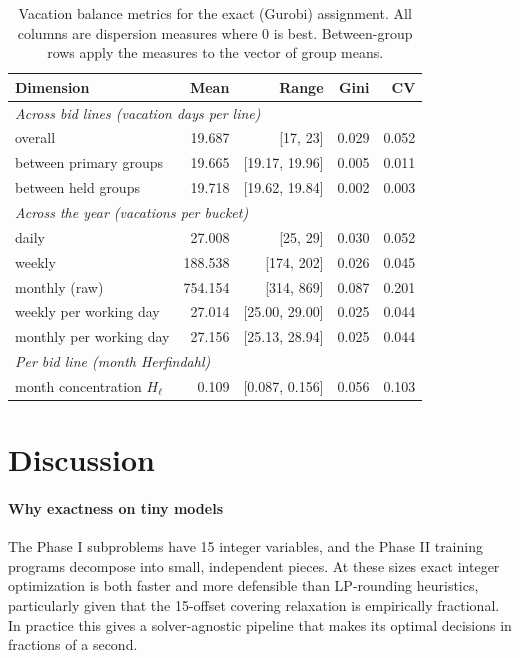 \documentclass[preprint,12pt]{elsarticle}
\begin{document}
      \begin{table}[t]
         \centering
         \caption{Vacation balance metrics for the exact (Gurobi) assignment. All columns are dispersion measures where $0$ is best. Between-group rows apply the measures to the vector of group means.}
         \label{tab:balance}
         \begin{tabular}{lrrrr}
         \toprule
         Dimension & Mean & Range & Gini & CV \\
         \midrule
         \multicolumn{5}{l}{\emph{Across bid lines (vacation days per line)}}\\
         \quad overall                     & 19.687 & [17, 23] & 0.029 & 0.052 \\
         \quad between primary groups      & 19.665 & [19.17, 19.96] & 0.005 & 0.011 \\
         \quad between held groups         & 19.718 & [19.62, 19.84] & 0.002 & 0.003 \\
         \multicolumn{5}{l}{\emph{Across the year (vacations per bucket)}}\\
         \quad daily                       & 27.008 & [25, 29] & 0.030 & 0.052 \\
         \quad weekly                      & 188.538 & [174, 202] & 0.026 & 0.045 \\
         \quad monthly (raw)               & 754.154 & [314, 869] & 0.087 & 0.201 \\
         \quad weekly per working day      & 27.014 & [25.00, 29.00] & 0.025 & 0.044 \\
         \quad monthly per working day     & 27.156 & [25.13, 28.94] & 0.025 & 0.044 \\
         \multicolumn{5}{l}{\emph{Per bid line (month Herfindahl)}}\\
         \quad month concentration $H_\ell$ & 0.109 & [0.087, 0.156] & 0.056 & 0.103 \\
         \bottomrule
         \end{tabular}
      \end{table}

\section{Discussion}
   \paragraph{Why exactness on tiny models} The Phase I subproblems have 15 integer variables, and the Phase II training programs decompose into small, independent pieces. At these sizes exact integer optimization is both faster and more defensible than LP-rounding heuristics, particularly given that the 15-offset covering relaxation is empirically fractional. In practice this gives a solver-agnostic pipeline that makes its optimal decisions in fractions of a second.
\end{document}
